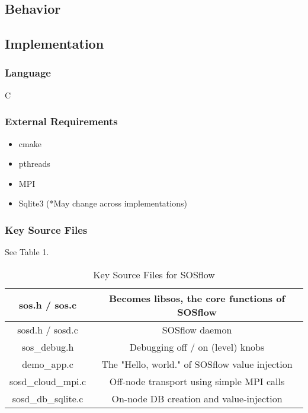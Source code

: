 \subsection{Behavior}

\subsection{Implementation}
\subsubsection{Language}C
\subsubsection{External Requirements}

\begin{itemize}
    \item cmake
    \item pthreads
    \item MPI
    \item Sqlite3 (*May change across implementations)
\end{itemize}

\subsubsection{Key Source Files}
See Table 1.

\begin{table}[!t]
\renewcommand{\arraystretch}{1.3}
\caption{Key Source Files for SOSflow}
\label{table_example}
\centering
\begin{tabular}{|c|c|}
\hline %
sos.h / sos.c & Becomes libsos, the core functions of SOSflow\\
\hline %
sosd.h / sosd.c & SOSflow daemon\\
\hline %
sos\_debug.h & Debugging off / on (level) knobs\\
\hline %
demo\_app.c & The "Hello, world." of SOSflow value injection\\
\hline %
sosd\_cloud\_mpi.c & Off-node transport using simple MPI calls\\
\hline %
sosd\_db\_sqlite.c & On-node DB creation and value-injection\\
\hline %
\end{tabular}
\end{table}

